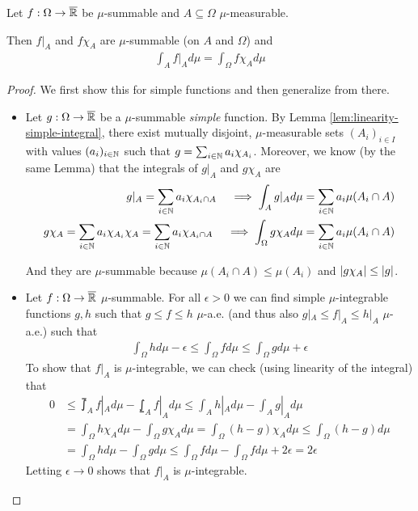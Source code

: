 
\begin{lem}[] \label{lem:restriction-integral}
Let $f: \Omega \to \overline{\mathbb{R}}$ be $\mu$-summable and $A \subseteq \Omega$ $\mu$-measurable.

Then $f|_{A}$ and $f \chi_{A}$ are $\mu$-summable (on $A$ and $\Omega$) and
\begin{align*}
  \int_{A} f|_{A} d \mu = \int_{\Omega} f \chi_{A} d \mu
\end{align*}
\end{lem}
\begin{proof}
  We first show this for simple functions and then generalize from there.
  \begin{itemize}
    \item Let $g: \Omega \to \overline{\mathbb{R}}$ be a $\mu$-summable \emph{simple} function.
      By Lemma \ref{lem:linearity-simple-integral}, there exist mutually disjoint, $\mu$-measurable sets $(A_i)_{i \in I}$ with values $(a_i)_{i \in \mathbb{N}}$ such that $g = \sum_{i \in \mathbb{N}} a_i \chi_{A_i}$.
      Moreover, we know (by the same Lemma) that the integrals of $g|_{A}$ and $g \chi_{A}$ are
      \begin{align*}
        g|_{A} = \sum_{i \in \mathbb{N}} a_i \chi_{A_i \cap A}
        \quad
        \implies \int_{A} g|_{A} d \mu &= \sum_{i \in \mathbb{N}} a_i \mu(A_i \cap A)
        \\
        g \chi_{A}  = \sum_{i \in \mathbb{N}} a_i \chi_{A_i} \chi_{A} = \sum_{i \in \mathbb{N}} a_i \chi_{A_i \cap A}
        \quad
        \implies \int_{\Omega} g \chi_{A} d \mu &= \sum_{i \in \mathbb{N}} a_i \mu(A_i \cap A)
      \end{align*}

      And they are $\mu$-summable 
      because $\mu(A_i \cap A) \leq \mu(A_i)$ and $\vert g \chi_{A}\vert \leq \vert g\vert$.
    \item Let $f: \Omega \to  \overline{\mathbb{R}}$ $\mu$-summable.
      For all $\epsilon > 0$ we can find simple $\mu$-integrable functions $g,h$ such that $g \leq f \leq h$ $\mu$-a.e. (and thus also $g|_{A} \leq f|_{A} \leq h|_{A}$ $\mu$-a.e.)
      such that
      \begin{align*}
        \int_{\Omega} h d \mu - \epsilon \leq
        \int_{\Omega} f d \mu \leq \int_{\Omega} g d \mu + \epsilon
      \end{align*}
      To show that $f|_{A}$ is $\mu$-integrable, we can check (using linearity of the integral) that
      \begin{align*}
        0
        &\leq
        \upint_{A} f|_{A} d \mu - \lowint_{A} f|_A d \mu 
        \leq 
        \int_{A} h|_A d \mu - \int_{A} g|_A d \mu
        \\
        &=
        \int_{\Omega} h \chi_A d \mu - \int_{\Omega} g \chi_A d \mu
        =
        \int_{\Omega} (h-g) \chi_A d \mu
        \leq
        \int_{\Omega} (h-g) d \mu
        \\
        &=
        \int_{\Omega} h d \mu - \int_{\Omega} g d \mu 
        \leq 
        \int_{\Omega} f d \mu - \int_{\Omega} f d \mu + 2 \epsilon 
        = 
        2 \epsilon
      \end{align*}
      Letting $\epsilon \to 0$ shows that $f|_A$ is $\mu$-integrable.


\end{itemize}
\end{proof}

